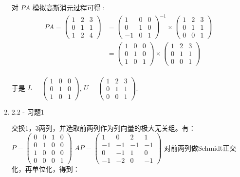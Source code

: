\documentclass{article}
\begin{document}
\begin{spacing}{1.5}
\begin{enumerate}
    对 $PA$ 模拟高斯消元过程可得 :
    $$
    \begin{array}{ll}
        PA = \left(\begin{array}{ccc}1&2&3\\0&1&1\\1&2&4\end{array}\right)
           &= \left(\begin{array}{ccc}1&0&0\\0&1&0\\-1&0&1\end{array}\right)^{-1}\times 
              \left(\begin{array}{ccc}1&2&3\\0&1&1\\0&0&1\end{array}\right)\\
           &= \left(\begin{array}{ccc}1&0&0\\0&1&0\\1&0&1\end{array}\right)\times 
              \left(\begin{array}{ccc}1&2&3\\0&1&1\\0&0&1\end{array}\right)\\
    \end{array}
    $$

    于是 $L = \left(\begin{array}{ccc}1&0&0\\0&1&0\\1&0&1\end{array}\right)$, $U=\left(\begin{array}{ccc}1&2&3\\0&1&1\\0&0&1\end{array}\right)$.

    \item 2.2 - 习题1
    
    交换1，3两列，并选取前两列作为列向量的极大无关组。有：$P = \left(\begin{array}{cccc}0&0&1&0\\0&1&0&0\\1&0&0&0\\0&0&0&1\end{array}\right)$
    $AP = \left(\begin{array}{cccc}1&0&2&1\\-1&-1&-1&-1\\0&-1&1&0\\-1&-2&0&-1\end{array}\right)$
    对前两列做Schmidt正交化，再单位化，得到：


\end{enumerate}
\end{spacing}
\end{document}
